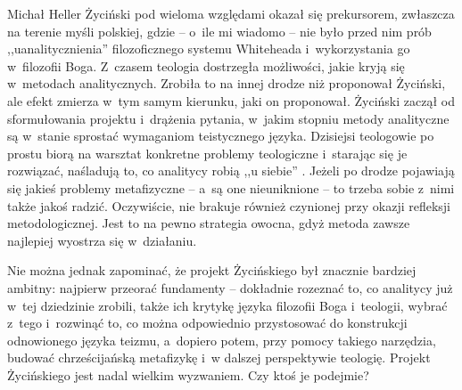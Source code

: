 \begin{artplenv}{Michał Heller}
Życiński pod wieloma względami okazał się prekursorem, zwłaszcza na terenie myśli polskiej, gdzie -- o~ile mi wiadomo -- nie było przed nim prób ,,uanalitycznienia'' filozoficznego systemu White\-heada i~wykorzystania go w~filozofii Boga. Z~czasem teologia dostrzegła możliwości, jakie kryją się w~metodach analitycznych. Zrobiła to na innej drodze niż proponował Życiński, ale efekt zmierza w~tym samym kierunku, jaki on proponował. Życiński zaczął od sformułowania projektu i~drążenia pytania, w~jakim stopniu metody analityczne są w~stanie sprostać wymaganiom teistycznego języka. Dzisiejsi teologowie po prostu biorą na warsztat konkretne problemy teologiczne i~starając się je rozwiązać, naśladują to, co analitycy robią ,,u siebie''
\parencites[por. np.][]{crisp_analytic_2009}[pojawiła się także polska ,,jaskółka'':][]{holda_kochac_2021}. %
 Jeżeli po drodze pojawiają się jakieś problemy metafizyczne -- a~są one nieuniknione -- to trzeba sobie z~nimi także jakoś radzić. Oczywiście, nie brakuje również czynionej przy okazji refleksji metodologicznej. Jest to na pewno strategia owocna, gdyż metoda zawsze najlepiej wyostrza się w~działaniu.

Nie można jednak zapominać, że projekt Życińskiego był znacznie bardziej ambitny: najpierw przeorać fundamenty -- dokładnie rozeznać to, co analitycy już w~tej dziedzinie zrobili, także ich krytykę języka filozofii Boga i~teologii, wybrać z~tego i~rozwinąć to, co można odpowiednio przystosować do konstrukcji odnowionego języka teizmu, a~dopiero potem, przy pomocy takiego narzędzia, budować chrześcijańską metafizykę i~w dalszej perspektywie teologię. Projekt Życińskiego jest nadal wielkim wyzwaniem. Czy ktoś je podejmie?




\end{artplenv}
